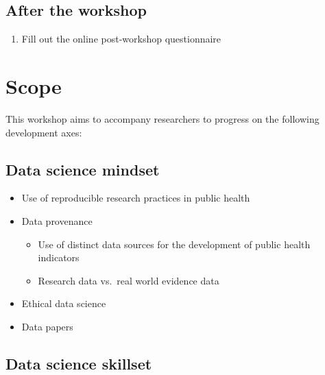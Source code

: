 \documentclass[
  letterpaper,
  DIV=11,
  numbers=noendperiod,
  oneside]{scrreprt}
\providecommand{\tightlist}{%
  \setlength{\itemsep}{0pt}\setlength{\parskip}{0pt}}\usepackage{longtable,booktabs,array}
\begin{document}
\hypertarget{after-the-workshop}{%
\subsection{After the workshop}\label{after-the-workshop}}

\begin{enumerate}
\def\labelenumi{\arabic{enumi}.}
\tightlist
\item
  Fill out the online post-workshop questionnaire
\end{enumerate}

\hypertarget{scope}{%
\section{Scope}\label{scope}}

This workshop aims to accompany researchers to progress on the following
development axes:

\hypertarget{data-science-mindset}{%
\subsection{Data science mindset}\label{data-science-mindset}}

\begin{itemize}
\tightlist
\item
  Use of reproducible research practices in public health
\item
  Data provenance

  \begin{itemize}
  \tightlist
  \item
    Use of distinct data sources for the development of public health
    indicators
  \item
    Research data vs.~real world evidence data
  \end{itemize}
\item
  Ethical data science
\item
  Data papers
\end{itemize}

\hypertarget{data-science-skillset}{%
\subsection{Data science skillset}\label{data-science-skillset}}
\end{document}
